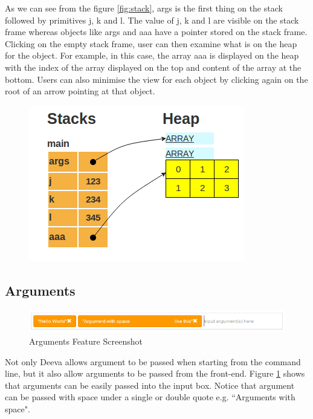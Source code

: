 \documentclass[11pt, a4paper]{article}
\begin{document}
As we can see from the figure \ref{fig:stack}, args is the first thing on the stack followed by primitives j, k and l.
The value of j, k and l are visible on the stack frame whereas objects like args and aaa have a pointer stored on the stack frame.
Clicking on the empty stack frame, user can then examine what is on the heap for the object.
For example, in this case, the array aaa is displayed on the heap with the index of the array displayed on the top and content of the array at the bottom. 
Users can also minimise the view for each object by clicking again on the root of an arrow pointing at that object.
\begin{figure}[h!]
\centering
\includegraphics[scale=0.5]{heap.png}
\end{figure}

\subsection{Arguments}
\begin{figure}[h!]
\centering
\includegraphics[scale=0.7]{argumentFeature.png}
\caption{Arguments Feature Screenshot}
\label{fig:argumentFeature}
\end{figure}
Not only Deeva allows argument to be passed when starting from the command line, but it also allow arguments to be passed from the front-end.
Figure \ref{fig:argumentFeature} shows that arguments can be easily passed into the input box. Notice that argument can be passed with space under a single or double quote e.g. ``Arguments with space".
\end{document}
